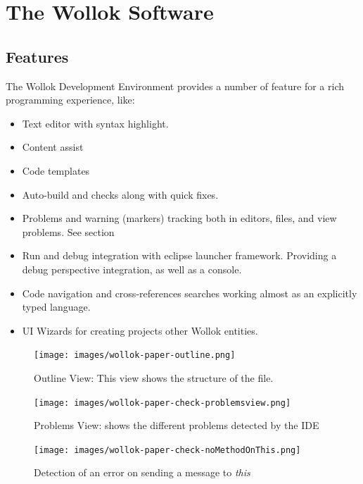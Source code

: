\section{The Wollok Software}

\subsection{Features}
The Wollok Development Environment provides a number of feature for a rich programming experience, like:

\begin{itemize}
 \item Text editor with syntax highlight.
 \item Content assist
 \item Code templates
 \item Auto-build and checks along with quick fixes.
 \item Problems and warning (markers) tracking both in editors, files, and view problems. See section 
 \item Run and debug integration with eclipse launcher framework. Providing a debug perspective integration, as well as a console.
 \item Code navigation and cross-references searches working almost as an explicitly typed language.
 \item UI Wizards for creating projects other Wollok entities.
\end{itemize}


\begin{figure}[ht]
    \centering
	\texttt{[image: images/wollok-paper-outline.png]}
    \caption{Outline View: This view shows the structure of the file.}
    \label{fig:outline.png}
\end{figure}

\begin{figure}[ht]
    \centering
	\texttt{[image: images/wollok-paper-check-problemsview.png]}
    \caption{Problems View: shows the different problems detected by the IDE }
    \label{fig:problemsview.png}
\end{figure}

\begin{figure}[ht]
    \centering
	\texttt{[image: images/wollok-paper-check-noMethodOnThis.png]}
    \caption{Detection of an error on sending a message to \emph{this}}
    \label{fig:check-noMethodOnThis.png}
\end{figure}


